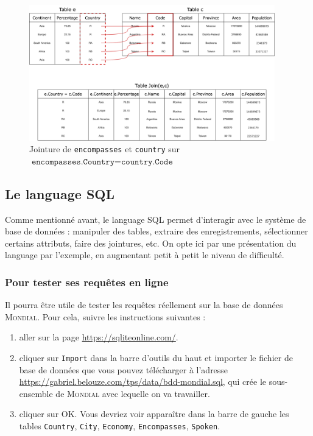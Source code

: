 \begin{figure}[h]
	\begin{center}
		\includegraphics[width=0.95\textwidth]{figures/12/bddr-mondial.png}
	\end{center}
	\caption{Jointure de \texttt{encompasses} et \texttt{country} sur $ \texttt{encompasses.Country} = \texttt{country.Code} $ }
	\label{fig:jointure}
\end{figure}


\subsection{Le language SQL}

Comme mentionné avant, le language SQL permet d'interagir avec le système de base de données : manipuler des tables, extraire des enregistrements, sélectionner certains attributs, faire des jointures, etc. On opte ici par une présentation du language par l'exemple, en augmentant petit à petit le niveau de difficulté.

\subsubsection*{Pour tester ses requêtes en ligne}

Il pourra être utile de tester les requêtes réellement sur la base de données \textsc{Mondial}. Pour cela, suivre les instructions suivantes :
\begin{enumerate}
	\item aller sur la page \href{https://sqliteonline.com/}{https://sqliteonline.com/}.
	\item cliquer sur \texttt{Import} dans la barre d'outils du haut et importer le fichier de base de données que vous pouvez télécharger à l'adresse \href{https://gabriel.belouze.com/tps/data/bdd-mondial.sql}{https://gabriel.belouze.com/tps/data/bdd-mondial.sql}, qui crée le sous-ensemble de \textsc{Mondial} avec lequelle on va travailler.
	\item  cliquer sur OK. Vous devriez voir apparaître dans la barre de gauche les tables \texttt{Country}, \texttt{City}, \texttt{Economy}, \texttt{Encompasses}, \texttt{Spoken}.
\end{enumerate}

